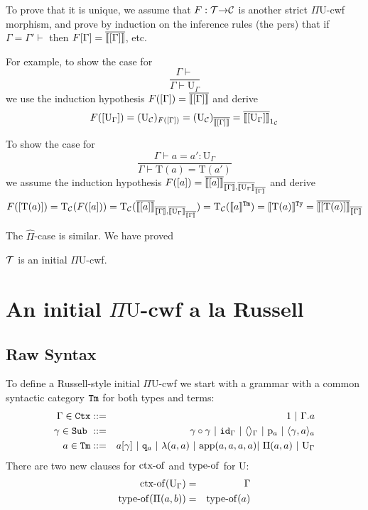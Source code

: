 \documentclass{lmcs}
\def\UU{\mathrm{U}}
\def\Ta{\mathrm{T}}
\def\Pihat{\hat{\Pi}}
\newcommand{\intTyU}[1]{\llbracket #1 \rrbracket^\RawTy}
\newcommand{\intTmU}[1]{\llbracket #1 \rrbracket^\RawTm}
\begin{document}
To prove that it is unique, we assume that $F : {\mathcal T} {\rightarrow} {\mathcal C}$ is another strict $\Pi\UU$-cwf
morphism, and prove by induction on the inference rules (the pers) that if $\Gamma = \Gamma' \vdash$
then $F[\Gamma] = \overline{\llbracket [\Gamma] \rrbracket}$, etc.  

For example, to show the case for 
$$
\frac{\Gamma \vdash}{\Gamma \vdash \UU_\Gamma}
$$
we use the induction hypothesis $F([\Gamma]) = \overline{\llbracket [\Gamma] \rrbracket}$ and derive 
$$
F([\UU_\Gamma]) = (\UU_\C)_{F([\Gamma])} = (\UU_\C)_{\iniCtx{[\Gamma]}} = \iniTy{1_\C}{[\UU_\Gamma]}
$$

To show the case for 
$$
\frac{\Gamma \vdash a = a' : \UU_\Gamma}
{\Gamma \vdash \Ta(a) = \Ta(a' )}
$$
we assume the induction hypothesis 
 $F([a]) = \iniTm{\iniCtx{\Gamma}}{\iniTy{\iniCtx{\Gamma}}{\UU_\Gamma}}{[a]}$
and derive
$$
F([\Ta(a)]) = \Ta_\C(F([a])) = \Ta_\C(\iniTm{\iniCtx{\Gamma}}{\iniTy{\iniCtx{\Gamma}}{\UU_\Gamma}}{[a]}) = \Ta_\C(\intTmU{a}) = \intTyU{\Ta(a)} = \iniTy{\iniCtx{\Gamma}}{[\Ta(a)]}
$$

The $\Pihat$-case is similar. We have proved
\begin{thm}\label{theom:initial_cwf}
  ${\mathcal T}$ is an initial $\Pi\UU$-cwf.
\end{thm}

%

\section{An initial $\Pi \UU$-cwf a la Russell}

\subsection{Raw Syntax}
To define a Russell-style initial $\Pi\UU$-cwf we start with a grammar with a common syntactic category ${\tt Tm}$ for both types and terms:
\begin{eqnarray*}
\Gamma \in \RawCtx &::=& 1  \ |\ \Gamma.a\\
\gamma \in \RawSub \ &::=& \gamma \circ \gamma \ |\ \id_\Gamma \ |\ \langle\rangle_\Gamma \ |\ \p_{a} \ |\ \langle \gamma, a \rangle_a\\
a \in \RawTm &::=& a [\gamma] \ |\ \qI_a\  |\   \lambda(a,a) \ |\ 
\ap(a,a,a,a) |\  \Pi(a,a)  \ |\  \UU_\Gamma
\end{eqnarray*}
There are two new clauses for $\operatorname{ctx-of}$ and $\operatorname{type-of}$ for $\UU$:
\begin{eqnarray*}
\ctxof(\UU_\Gamma) &=& \Gamma\\
\typeof(\Pi(a,b))&=& \typeof(a)
\end{eqnarray*}
\end{document}
